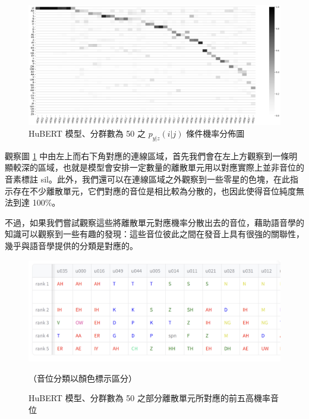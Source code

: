 \begin{figure}
    \centering
    \includegraphics[width=1\linewidth]{figures/11111111.png}
    \caption{HuBERT 模型、分群數為 50 之 $p_{y|z}(i|j)$ 條件機率分佈圖}
    \label{fig:hubert-50-givenunit-byprob}
\end{figure}
        觀察圖 \ref{fig:hubert-50-givenunit-byprob} 中由左上而右下角對應的連線區域，首先我們會在左上方觀察到一條明顯較深的區域，也就是模型會安排一定數量的離散單元用以對應實際上並非音位的音素標註 sil。此外，我們還可以在連線區域之外觀察到一些零星的色塊，在此指示存在不少離散單元，它們對應的音位是相比較為分散的，也因此使得音位純度無法到達 100\%。
        
        不過，如果我們嘗試觀察這些將離散單元對應機率分散出去的音位，藉助語音學的知識可以觀察到一些有趣的發現：這些音位彼此之間在發音上具有很強的關聯性，幾乎與語音學提供的分類是對應的。 


        \begin{figure}
            \centering
            \includegraphics[width=1\linewidth]{figures/unit_rank_phn.png}  %
            \caption[]{
 HuBERT 模型、分群數為 50 之部分離散單元所對應的前五高機率音位
}
                                          （音位分類以顏色標示區分）
            \label{fig:unit-to-phn-rankings}
        \end{figure}
        
